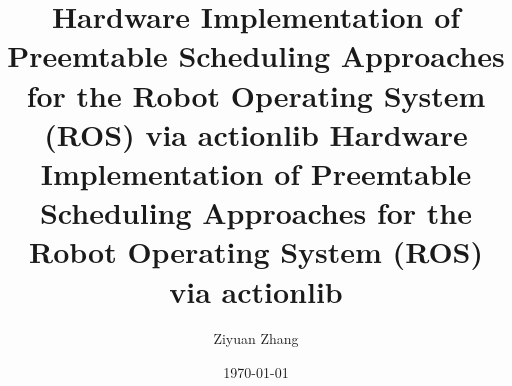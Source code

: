 \title{%
	Hardware Implementation of Preemtable Scheduling Approaches for the Robot Operating System (ROS) via actionlib
}
\subject{master} %
\title{%
  Hardware Implementation of Preemtable Scheduling Approaches for the Robot Operating System (ROS) via actionlib
}
\author{
	Ziyuan Zhang
}
\date{\today}
\maketitle
